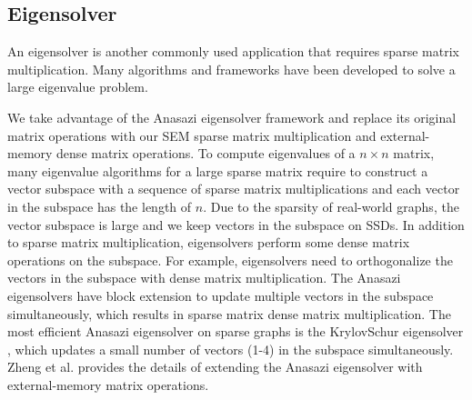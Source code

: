 
\subsection{Eigensolver}
An eigensolver is another commonly used application that requires sparse matrix
multiplication. Many algorithms \cite{Lanczos, IRLM, krylovschur} and frameworks
\cite{arpack, anasazi, slepc} have been developed to solve a large eigenvalue
problem.

We take advantage of the Anasazi eigensolver framework \cite{anasazi} and
replace its original matrix operations with our SEM sparse
matrix multiplication and external-memory dense matrix operations. To compute
eigenvalues of a $n \times n$ matrix, many eigenvalue algorithms for a large
sparse matrix require to construct a vector subspace with a sequence of
sparse matrix multiplications and each vector in the subspace has the length of $n$.
Due to the sparsity of real-world graphs, the vector subspace is large and we keep
vectors in the subspace on SSDs. In addition to sparse matrix
multiplication, eigensolvers perform some dense matrix operations on the subspace.
For example, eigensolvers need to orthogonalize the vectors in the subspace with
dense matrix multiplication. The Anasazi eigensolvers have block extension to
update multiple vectors in the subspace simultaneously, which results in sparse matrix dense
matrix multiplication. The most efficient Anasazi eigensolver on sparse graphs
is the KrylovSchur eigensolver \cite{krylovschur}, which updates a small number
of vectors (1-4) in the subspace simultaneously. Zheng et al.
\cite{flasheigen} provides the details of extending the Anasazi eigensolver
with external-memory matrix operations.


